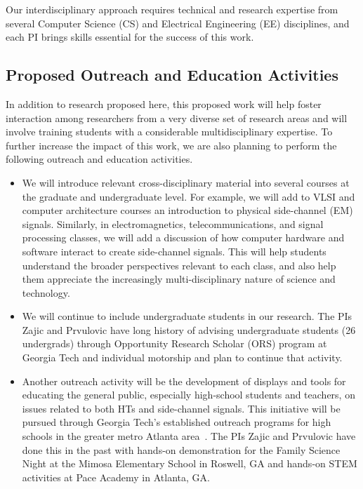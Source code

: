 \documentclass[11 pt]{article}
\def\denseitems{
  \itemsep1pt plus1pt minus1pt
  \parsep0pt plus0pt
  \parskip0pt
  \topsep0pt
}
\begin{document}
Our interdisciplinary approach requires technical and research
expertise from several Computer Science (CS) and Electrical Engineering (EE) disciplines, and each PI brings skills essential for the success of this work.

\subsection{Proposed Outreach and Education Activities}

In addition to research proposed here, this proposed work will help foster interaction among researchers from a
very diverse set of research areas and will involve training students
with a considerable multidisciplinary expertise. To further increase
the impact of this work, we are also planning to perform the following
outreach and education activities.

\begin{itemize}\denseitems

\item We will introduce relevant cross-disciplinary material into
  several courses at the graduate and undergraduate level. For
  example, we will add to VLSI and computer
  architecture courses an introduction to physical side-channel (EM)
  signals. Similarly, in electromagnetics, telecommunications, and
  signal processing classes, we will add a discussion of how computer
  hardware and software interact to create side-channel signals. This
  will help students understand the broader perspectives relevant to
  each class, and also help them appreciate the increasingly
  multi-disciplinary nature of science and technology.

\item We will continue to include undergraduate students in our
  research. The PIs Zajic and Prvulovic have long history of advising undergraduate students (26 undergrads) through
  Opportunity Research Scholar (ORS) program at Georgia Tech and individual motorship and plan to continue that activity.

\item Another outreach activity will be the development of displays
  and tools for educating the general public, especially high-school
  students and teachers, on issues related to both HTs and side-channel signals. This initiative will be
  pursued through Georgia Tech’s established outreach programs for
  high schools in the greater metro Atlanta area~\cite{Conrad2022}.
  The PIs Zajic and Prvulovic have done this in the past with hands-on demonstration for the Family Science Night at the Mimosa
  Elementary School in Roswell, GA and hands-on STEM activities at Pace Academy in Atlanta, GA.
\end{itemize}
\end{document}
